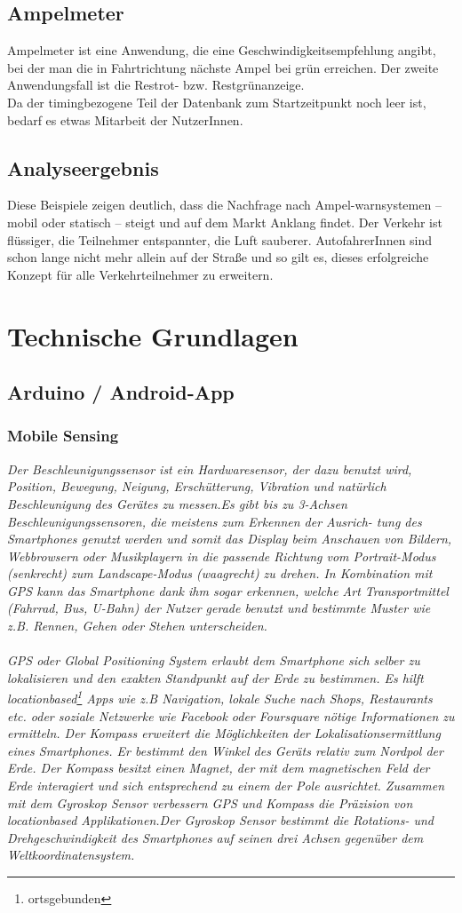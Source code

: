 \subsection{Ampelmeter}
Ampelmeter ist eine Anwendung, die eine Geschwindigkeitsempfehlung angibt, bei der man die in Fahrtrichtung nächste Ampel bei grün erreichen. Der zweite Anwendungsfall ist die Restrot- bzw. Restgrünanzeige.\\
Da der timingbezogene Teil der Datenbank zum Startzeitpunkt noch leer ist, bedarf es etwas Mitarbeit der NutzerInnen.
\subsection{Analyseergebnis}
Diese Beispiele zeigen deutlich, dass die Nachfrage nach Ampel-warnsystemen -- mobil oder statisch -- steigt und auf dem Markt Anklang findet. Der Verkehr ist flüssiger, die Teilnehmer entspannter, die Luft sauberer. AutofahrerInnen sind schon lange nicht mehr allein auf der Straße und so gilt es, dieses erfolgreiche Konzept für alle Verkehrteilnehmer zu erweitern.
\section{Technische Grundlagen}
\subsection{Arduino / Android-App}
\subsubsection{Mobile Sensing}
\textit{Der Beschleunigungssensor ist ein Hardwaresensor, der dazu benutzt wird, Position, Bewegung, Neigung, Erschütterung, Vibration und natürlich Beschleunigung des Gerätes zu messen.Es gibt bis zu 3-Achsen Beschleunigungssensoren, die meistens zum Erkennen der Ausrich-
tung des Smartphones genutzt werden und somit das Display beim Anschauen von Bildern,
Webbrowsern oder Musikplayern in die passende Richtung vom Portrait-Modus (senkrecht)
zum Landscape-Modus (waagrecht) zu drehen. In Kombination mit GPS kann das Smartphone
dank ihm sogar erkennen, welche Art Transportmittel (Fahrrad, Bus, U-Bahn) der Nutzer gerade
benutzt und bestimmte Muster wie z.B. Rennen, Gehen oder Stehen unterscheiden.\\\\
GPS oder Global Positioning System erlaubt dem Smartphone sich selber zu lokalisieren und
den exakten Standpunkt auf der Erde zu bestimmen. Es hilft locationbased\footnote{ortsgebunden} Apps wie z.B Navigation, lokale Suche nach Shops, Restaurants etc. oder soziale Netzwerke wie Facebook oder Foursquare nötige Informationen zu ermitteln. Der Kompass erweitert die Möglichkeiten der Lokalisationsermittlung eines Smartphones. Er bestimmt den Winkel des Geräts relativ zum Nordpol der Erde. Der Kompass besitzt einen Magnet, der mit dem magnetischen Feld der Erde interagiert und sich entsprechend zu einem der Pole ausrichtet. Zusammen mit dem Gyroskop Sensor verbessern GPS und Kompass die Präzision von locationbased Applikationen.Der Gyroskop Sensor bestimmt die Rotations- und Drehgeschwindigkeit des Smartphones auf seinen drei Achsen gegenüber dem Weltkoordinatensystem.}
